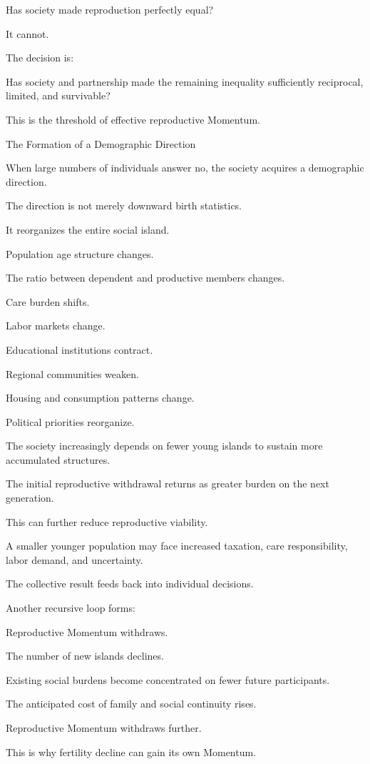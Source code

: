Has society made reproduction perfectly equal?

It cannot.

The decision is:

Has society and partnership made the remaining inequality sufficiently reciprocal, limited, and survivable?

This is the threshold of effective reproductive Momentum.

The Formation of a Demographic Direction

When large numbers of individuals answer no, the society acquires a demographic direction.

The direction is not merely downward birth statistics.

It reorganizes the entire social island.

Population age structure changes.

The ratio between dependent and productive members changes.

Care burden shifts.

Labor markets change.

Educational institutions contract.

Regional communities weaken.

Housing and consumption patterns change.

Political priorities reorganize.

The society increasingly depends on fewer young islands to sustain more accumulated structures.

The initial reproductive withdrawal returns as greater burden on the next generation.

This can further reduce reproductive viability.

A smaller younger population may face increased taxation, care responsibility, labor demand, and uncertainty.

The collective result feeds back into individual decisions.

Another recursive loop forms:

Reproductive Momentum withdraws.

The number of new islands declines.

Existing social burdens become concentrated on fewer future participants.

The anticipated cost of family and social continuity rises.

Reproductive Momentum withdraws further.

This is why fertility decline can gain its own Momentum.

